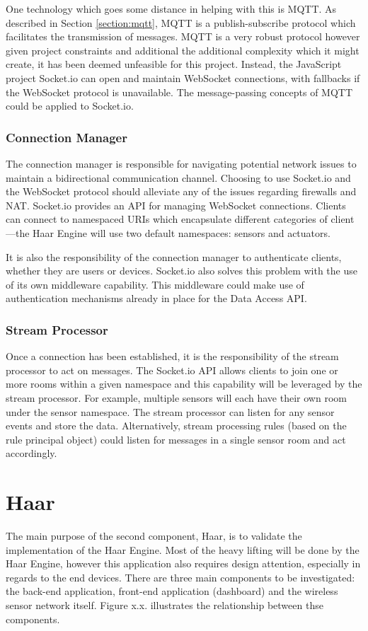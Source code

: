       One technology which goes some distance in helping with this is MQTT. As described in Section \ref{section:mqtt}, MQTT is a publish-subscribe protocol which facilitates the transmission of messages. MQTT is a very robust protocol however given project constraints and additional the additional complexity which it might create, it has been deemed unfeasible for this project. Instead, the JavaScript project Socket.io can open and maintain WebSocket connections, with fallbacks if the WebSocket protocol is unavailable. The message-passing concepts of MQTT could be applied to Socket.io.

      \subsubsection{Connection Manager}
        The connection manager is responsible for navigating potential network issues to maintain a bidirectional communication channel. Choosing to use Socket.io and the WebSocket protocol should alleviate any of the issues regarding firewalls and NAT. Socket.io provides an API for managing WebSocket connections. Clients can connect to namespaced URIs which encapsulate different categories of client---the Haar Engine will use two default namespaces: sensors and actuators.

        It is also the responsibility of the connection manager to authenticate clients, whether they are users or devices. Socket.io also solves this problem with the use of its own middleware capability. This middleware could make use of authentication mechanisms already in place for the Data Access API.

      \subsubsection{Stream Processor}
        Once a connection has been established, it is the responsibility of the stream processor to act on messages. The Socket.io API allows clients to join one or more rooms within a given namespace and this capability will be leveraged by the stream processor. For example, multiple sensors will each have their own room under the sensor namespace. The stream processor can listen for any sensor events and store the data. Alternatively, stream processing rules (based on the rule principal object) could listen for messages in a single sensor room and act accordingly.

  \section{Haar}
    The main purpose of the second component, Haar, is to validate the implementation of the Haar Engine. Most of the heavy lifting will be done by the Haar Engine, however this application also requires design attention, especially in regards to the end devices. There are three main components to be investigated: the back-end application, front-end application (dashboard) and the wireless sensor network itself. Figure x.x. illustrates the relationship between thse components.

